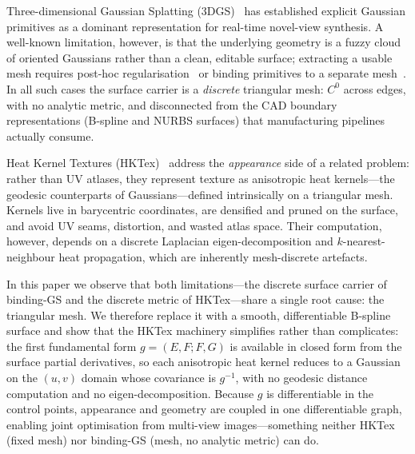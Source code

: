 \documentclass[acmtog, review=true, authorversion=false]{acmart}
\begin{document}
Three-dimensional Gaussian Splatting (3DGS)~\cite{kerbl3Dgaussians} has
established explicit Gaussian primitives as a dominant representation for
real-time novel-view synthesis. A well-known limitation, however, is that
the underlying geometry is a fuzzy cloud of oriented Gaussians rather than a
clean, editable surface; extracting a usable mesh requires post-hoc
regularisation~\cite{sugar} or binding primitives to a separate
mesh~\cite{omega, meshgs, gaustar}. In all such cases the surface carrier is
a \emph{discrete} triangular mesh: $C^0$ across edges, with no analytic
metric, and disconnected from the CAD boundary representations (B-spline and
NURBS surfaces) that manufacturing pipelines actually consume.

Heat Kernel Textures (HKTex)~\cite{hktex} address the \emph{appearance} side
of a related problem: rather than UV atlases, they represent texture as
anisotropic heat kernels---the geodesic counterparts of Gaussians---defined
intrinsically on a triangular mesh. Kernels live in barycentric coordinates,
are densified and pruned on the surface, and avoid UV seams, distortion, and
wasted atlas space. Their computation, however, depends on a discrete
Laplacian eigen-decomposition and $k$-nearest-neighbour heat propagation,
which are inherently mesh-discrete artefacts.

In this paper we observe that both limitations---the discrete surface carrier
of binding-GS and the discrete metric of HKTex---share a single root cause:
the triangular mesh. We therefore replace it with a smooth, differentiable
B-spline surface and show that the HKTex machinery simplifies rather than
complicates: the first fundamental form
$g = (E,F;F,G)$ is available in closed form from the surface partial
derivatives, so each anisotropic heat kernel reduces to a Gaussian on the
$(u,v)$ domain whose covariance is $g^{-1}$, with no geodesic distance
computation and no eigen-decomposition. Because $g$ is differentiable in the
control points, appearance and geometry are coupled in one differentiable
graph, enabling joint optimisation from multi-view images---something neither
HKTex (fixed mesh) nor binding-GS (mesh, no analytic metric) can do.
\end{document}

